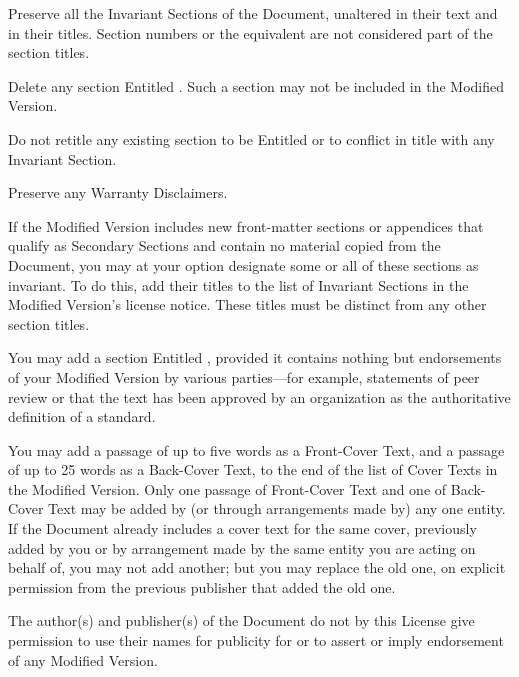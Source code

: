 \item[L.]
   Preserve all the Invariant Sections of the Document,
   unaltered in their text and in their titles.  Section numbers
   or the equivalent are not considered part of the section titles.

\item[M.]
   Delete any section Entitled .  Such a section
   may not be included in the Modified Version.

\item[N.]
   Do not retitle any existing section to be Entitled 
   or to conflict in title with any Invariant Section.

\item[O.]
   Preserve any Warranty Disclaimers.
\stopitemize

If the Modified Version includes new front-matter sections or
appendices that qualify as Secondary Sections and contain no material
copied from the Document, you may at your option designate some or all
of these sections as invariant.  To do this, add their titles to the
list of Invariant Sections in the Modified Version's license notice.
These titles must be distinct from any other section titles.

You may add a section Entitled , provided it contains
nothing but endorsements of your Modified Version by various
parties---for example, statements of peer review or that the text has
been approved by an organization as the authoritative definition of a
standard.

You may add a passage of up to five words as a Front-Cover Text, and a
passage of up to 25 words as a Back-Cover Text, to the end of the list
of Cover Texts in the Modified Version.  Only one passage of
Front-Cover Text and one of Back-Cover Text may be added by (or
through arrangements made by) any one entity.  If the Document already
includes a cover text for the same cover, previously added by you or
by arrangement made by the same entity you are acting on behalf of,
you may not add another; but you may replace the old one, on explicit
permission from the previous publisher that added the old one.

The author(s) and publisher(s) of the Document do not by this License
give permission to use their names for publicity for or to assert or
imply endorsement of any Modified Version.


\stopalignment


